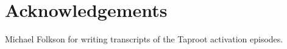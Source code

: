 \chapter{Acknowledgements}

Michael Folkson for writing transcripts of the Taproot activation episodes.
